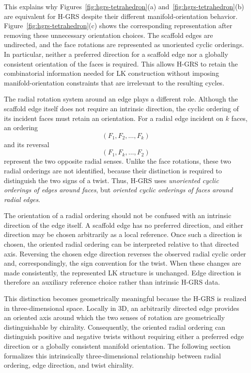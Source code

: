 \documentclass[acmtog]{acmart}
\begin{document}
This explains why Figures~\ref{fig:hgrs-tetrahedron}(a) and~\ref{fig:hgrs-tetrahedron}(b) are equivalent for H-GRS despite their different manifold-orientation behavior. Figure~\ref{fig:hgrs-tetrahedron}(c) shows the corresponding representation after removing these unnecessary orientation choices. The scaffold edges are undirected, and the face rotations are represented as unoriented cyclic orderings. In particular, neither a preferred direction for a scaffold edge nor a globally consistent orientation of the faces is required. This allows H-GRS to retain the combinatorial information needed for LK construction without imposing manifold-orientation constraints that are irrelevant to the resulting cycles.

The radial rotation system around an edge plays a different role. Although the scaffold edge itself does not require an intrinsic direction, the cyclic ordering of its incident faces must retain an orientation. For a radial edge incident on $k$ faces, an ordering
\[
(F_1,F_2,\ldots,F_k)
\]
and its reversal
\[
(F_1,F_k,\ldots,F_2)
\]
represent the two opposite radial senses. Unlike the face rotations, these two radial orderings are not identified, because their distinction is required to distinguish the two signs of a twist. Thus, H-GRS uses \emph{unoriented cyclic orderings of edges around faces}, but \emph{oriented cyclic orderings of faces around radial edges}.

The orientation of a radial ordering should not be confused with an intrinsic direction of the edge itself. A scaffold edge has no preferred direction, and either direction may be chosen arbitrarily as a local reference. Once such a direction is chosen, the oriented radial ordering can be interpreted relative to that directed axis. Reversing the chosen edge direction reverses the observed radial cyclic order and, correspondingly, the sign convention for the twist. When these changes are made consistently, the represented LK structure is unchanged. Edge direction is therefore an auxiliary reference choice rather than intrinsic H-GRS data.

This distinction becomes geometrically meaningful because the H-GRS is realized in three-dimensional space. Locally in 3D, an arbitrarily directed edge provides an oriented axis around which the two senses of rotation are geometrically distinguishable by chirality. Consequently, the oriented radial ordering can distinguish positive and negative twists without requiring either a preferred edge direction or a globally consistent manifold orientation. The following section formalizes this intrinsically three-dimensional relationship between radial ordering, edge direction, and twist chirality.
\end{document}
